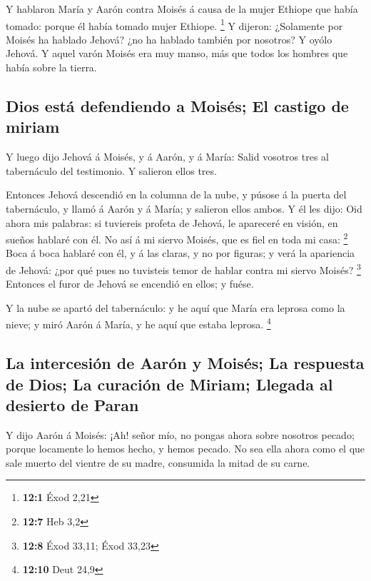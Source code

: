  Y hablaron María y Aarón contra Moisés á causa de la mujer
Ethiope que había tomado: porque él había tomado mujer Ethiope.
\footnote{\textbf{12:1} Éxod 2,21}  Y dijeron: ¿Solamente
por Moisés ha hablado Jehová? ¿no ha hablado también por nosotros? Y
oyólo Jehová.  Y aquel varón Moisés era muy manso, más que
todos los hombres que había sobre la tierra.

\hypertarget{dios-estuxe1-defendiendo-a-moisuxe9s-el-castigo-de-miriam}{%
\subsection{Dios está defendiendo a Moisés; El castigo de
miriam}\label{dios-estuxe1-defendiendo-a-moisuxe9s-el-castigo-de-miriam}}

 Y luego dijo Jehová á Moisés, y á Aarón, y á María: Salid
vosotros tres al tabernáculo del testimonio. Y salieron ellos tres.

 Entonces Jehová descendió en la columna de la nube, y
púsose á la puerta del tabernáculo, y llamó á Aarón y á María; y
salieron ellos ambos.  Y él les dijo: Oid ahora mis
palabras: si tuviereis profeta de Jehová, le apareceré en visión, en
sueños hablaré con él.  No así á mi siervo Moisés, que es
fiel en toda mi casa: \footnote{\textbf{12:7} Heb 3,2}  Boca
á boca hablaré con él, y á las claras, y no por figuras; y verá la
apariencia de Jehová: ¿por qué pues no tuvisteis temor de hablar contra
mi siervo Moisés? \footnote{\textbf{12:8} Éxod 33,11; Éxod 33,23}
 Entonces el furor de Jehová se encendió en ellos; y fuése.

 Y la nube se apartó del tabernáculo: y he aquí que María
era leprosa como la nieve; y miró Aarón á María, y he aquí que estaba
leprosa. \footnote{\textbf{12:10} Deut 24,9}

\hypertarget{la-intercesiuxf3n-de-aaruxf3n-y-moisuxe9s-la-respuesta-de-dios-la-curaciuxf3n-de-miriam-llegada-al-desierto-de-paran}{%
\subsection{La intercesión de Aarón y Moisés; La respuesta de Dios; La
curación de Miriam; Llegada al desierto de
Paran}\label{la-intercesiuxf3n-de-aaruxf3n-y-moisuxe9s-la-respuesta-de-dios-la-curaciuxf3n-de-miriam-llegada-al-desierto-de-paran}}

 Y dijo Aarón á Moisés: ¡Ah! señor mío, no pongas ahora
sobre nosotros pecado; porque locamente lo hemos hecho, y hemos pecado.
 No sea ella ahora como el que sale muerto del vientre de
su madre, consumida la mitad de su carne.

